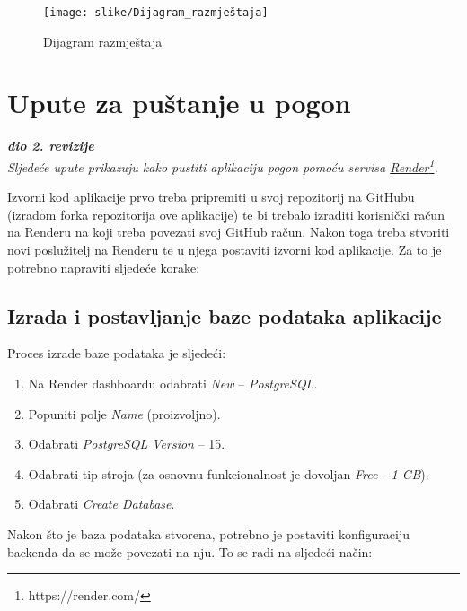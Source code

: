 \begin{figure}[!htb]
	\centering
	\texttt{[image: slike/Dijagram\_razmještaja]}
	\caption{Dijagram razmještaja}
\end{figure}

\eject

\section{Upute za puštanje u pogon}

\textbf{\textit{dio 2. revizije}}\\

\textit{Sljedeće upute prikazuju kako pustiti aplikaciju pogon pomoću servisa \underline{Render}\footnote{https://render.com/}.}

Izvorni kod aplikacije prvo treba pripremiti u svoj repozitorij na GitHubu (izradom forka repozitorija ove aplikacije) te bi trebalo izraditi korisnički račun na Renderu na koji treba povezati svoj GitHub račun. Nakon toga treba stvoriti novi poslužitelj na Renderu te u njega postaviti izvorni kod aplikacije. Za to je potrebno napraviti sljedeće korake:

\subsection{Izrada i postavljanje baze podataka aplikacije}

Proces izrade baze podataka je sljedeći:

\begin{enumerate}
	\item Na Render dashboardu odabrati \textit{New} -- \textit{PostgreSQL}.
	\item Popuniti polje \textit{Name} (proizvoljno).
	\item Odabrati \textit{PostgreSQL Version} -- 15.
	\item Odabrati tip stroja (za osnovnu funkcionalnost je dovoljan \textit{Free - 1 GB}).
	\item Odabrati \textit{Create Database}.
\end{enumerate}

Nakon što je baza podataka stvorena, potrebno je postaviti konfiguraciju backenda da se može povezati na nju. To se radi na sljedeći način:

